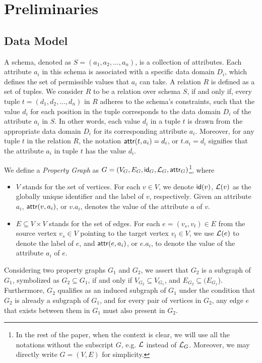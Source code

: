 \section{Preliminaries}
\label{sec:preliminaries}

\subsection{Data Model}
\label{sec:data-model}

A schema, denoted as \(S = (a_1, a_2, \ldots, a_n)\), is a collection of attributes. Each attribute \(a_i\) in this schema is associated with a specific data domain \(D_i\), which defines the set of permissible values that \(a_i\) can take.
A relation \(R\) is defined as a set of tuples. We consider \(R\) to be a relation over schema \(S\), if and only if, every tuple \(t = (d_1, d_2, \ldots, d_n)\) in \(R\) adheres to the schema's constraints, such that the value \(d_i\) for each position in the tuple corresponds to the data domain \(D_i\) of the attribute \(a_i\) in \(S\). In other words, each value \(d_i\) in a tuple \(t\) is drawn from the appropriate data domain \(D_i\) for its corresponding attribute \(a_i\).
Moreover, for any tuple \(t\) in the relation \(R\), the notation \({\mathsf{attr}}(t, a_i) = d_i\), or \(t.a_i = d_i\) signifies that the attribute \(a_i\) in tuple \(t\) has the value \(d_i\).

We define a \emph{Property Graph} as $G = (V_G, E_G, {\mathsf{id}}_G, \mathcal{L}_G, {\mathsf{attr}}_G)$\footnote{In the rest of the paper, when the context is clear, we will use all the notations without the subscript $G$, e.g. $\mathcal{L}$ instead of $\mathcal{L}_G$. Moreover, we may directly write $G=(V, E)$  for simplicity. }, where
\begin{itemize}
    \item $V$ stands for the set of vertices. For each $v \in V$, we denote ${\mathsf{id}}(v)$, $\mathcal{L}(v)$ as the globally unique identifier and the label of $v$, respectively. Given an attribute $a_i$, ${\mathsf{attr}}(v, a_i)$, or $v.a_i$, denotes the value of the attribute $a$ of $v$.
    \item $E \subseteq V \times V$ stands for the set of edges. For each $e = (v_s, v_t) \in E$ from the source vertex
    $v_s \in V$ pointing to the target vertex $v_t \in V$, we use $\mathcal{L}(e)$ to denote the label of $e$, and ${\mathsf{attr}}(e, a_i)$, or $e.a_i$, to denote the value of the attribute $a_i$ of $e$.
\end{itemize}

Considering two property graphs \(G_1\) and \(G_2\), we assert that \(G_2\) is a subgraph of \(G_1\), symbolized as \(G_2 \subseteq G_1\), if and only if \(V_{G_2} \subseteq V_{G_1}\), and \(E_{G_2} \subseteq (E_{G_1}\)). Furthermore, \(G_2\) qualifies as an induced subgraph of \(G_1\) under the condition that \(G_2\) is already a subgraph of \(G_1\), and for every pair of vertices in \(G_2\), any edge \(e\) that exists between them in \(G_1\) must also present in \(G_2\).

